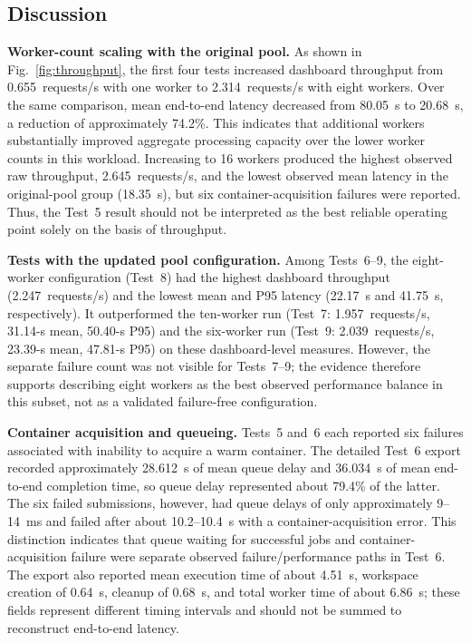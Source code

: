 \documentclass[conference]{IEEEtran}
\begin{document}
\subsection{Discussion}
\textbf{Worker-count scaling with the original pool.} As shown in Fig.~\ref{fig:throughput}, the first four tests increased dashboard throughput from 0.655~requests/s with one worker to 2.314~requests/s with eight workers. Over the same comparison, mean end-to-end latency decreased from 80.05~s to 20.68~s, a reduction of approximately 74.2\%. This indicates that additional workers substantially improved aggregate processing capacity over the lower worker counts in this workload. Increasing to 16 workers produced the highest observed raw throughput, 2.645~requests/s, and the lowest observed mean latency in the original-pool group (18.35~s), but six container-acquisition failures were reported. Thus, the Test~5 result should not be interpreted as the best reliable operating point solely on the basis of throughput.

\textbf{Tests with the updated pool configuration.} Among Tests~6--9, the eight-worker configuration (Test~8) had the highest dashboard throughput (2.247~requests/s) and the lowest mean and P95 latency (22.17~s and 41.75~s, respectively). It outperformed the ten-worker run (Test~7: 1.957~requests/s, 31.14-s mean, 50.40-s P95) and the six-worker run (Test~9: 2.039~requests/s, 23.39-s mean, 47.81-s P95) on these dashboard-level measures. However, the separate failure count was not visible for Tests~7--9; the evidence therefore supports describing eight workers as the best observed performance balance in this subset, not as a validated failure-free configuration.

\textbf{Container acquisition and queueing.} Tests~5 and~6 each reported six failures associated with inability to acquire a warm container. The detailed Test~6 export recorded approximately 28.612~s of mean queue delay and 36.034~s of mean end-to-end completion time, so queue delay represented about 79.4\% of the latter. The six failed submissions, however, had queue delays of only approximately 9--14~ms and failed after about 10.2--10.4~s with a container-acquisition error. This distinction indicates that queue waiting for successful jobs and container-acquisition failure were separate observed failure/performance paths in Test~6. The export also reported mean execution time of about 4.51~s, workspace creation of 0.64~s, cleanup of 0.68~s, and total worker time of about 6.86~s; these fields represent different timing intervals and should not be summed to reconstruct end-to-end latency.
\end{document}
